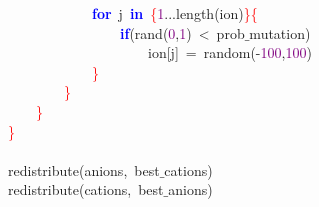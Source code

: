 \mbox{}\ \ \ \ \ \ \ \ \ \ \ \ \textbf{\textcolor{Blue}{for}}\ j\ \textbf{\textcolor{Blue}{in}}\ \textcolor{Red}{\{}\textcolor{Purple}{1}\textcolor{BrickRed}{...}length\textcolor{BrickRed}{(}ion\textcolor{BrickRed}{)}\textcolor{Red}{\}\{} \\
\mbox{}\ \ \ \ \ \ \ \ \ \ \ \ \ \ \ \ \textbf{\textcolor{Blue}{if}}\textcolor{BrickRed}{(}rand\textcolor{BrickRed}{(}\textcolor{Purple}{0}\textcolor{BrickRed}{,}\textcolor{Purple}{1}\textcolor{BrickRed}{)}\ \textcolor{BrickRed}{\textless{}}\ prob$\_$mutation\textcolor{BrickRed}{)} \\
\mbox{}\ \ \ \ \ \ \ \ \ \ \ \ \ \ \ \ \ \ \ \ ion\textcolor{BrickRed}{[}j\textcolor{BrickRed}{]}\ \textcolor{BrickRed}{=}\ random\textcolor{BrickRed}{(-}\textcolor{Purple}{100}\textcolor{BrickRed}{,}\textcolor{Purple}{100}\textcolor{BrickRed}{)} \\
\mbox{}\ \ \ \ \ \ \ \ \ \ \ \ \textcolor{Red}{\}} \\
\mbox{}\ \ \ \ \ \ \ \ \textcolor{Red}{\}} \\
\mbox{}\ \ \ \ \textcolor{Red}{\}} \\
\mbox{}\textcolor{Red}{\}} \\
\mbox{} \\
\mbox{}redistribute\textcolor{BrickRed}{(}anions\textcolor{BrickRed}{,}\ best$\_$cations\textcolor{BrickRed}{)} \\
\mbox{}redistribute\textcolor{BrickRed}{(}cations\textcolor{BrickRed}{,}\ best$\_$anions\textcolor{BrickRed}{)} \\
\mbox{}
